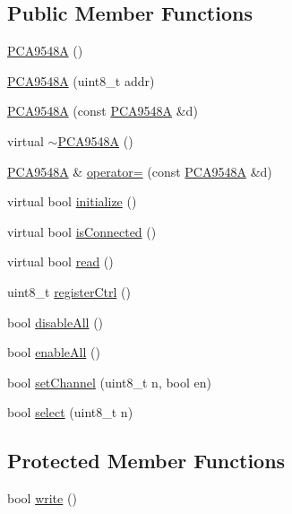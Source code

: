 \subsection*{Public Member Functions}
\begin{DoxyCompactItemize}
\item 
\hyperlink{classsmrtobj_1_1i2c_1_1_p_c_a9548_a_a5da9ee25001c545a42d15f09ed540369}{P\+C\+A9548\+A} ()
\item 
\hyperlink{classsmrtobj_1_1i2c_1_1_p_c_a9548_a_af71a3d8fb553e56b261e9ae4f170c6cc}{P\+C\+A9548\+A} (uint8\+\_\+t addr)
\item 
\hyperlink{classsmrtobj_1_1i2c_1_1_p_c_a9548_a_a9cb4de3e7ce618a7a9eab948f964f65b}{P\+C\+A9548\+A} (const \hyperlink{classsmrtobj_1_1i2c_1_1_p_c_a9548_a}{P\+C\+A9548\+A} \&d)
\item 
virtual \hyperlink{classsmrtobj_1_1i2c_1_1_p_c_a9548_a_a1ca58fa8d04182e8a4331c2df22f8ff0}{$\sim$\+P\+C\+A9548\+A} ()
\item 
\hyperlink{classsmrtobj_1_1i2c_1_1_p_c_a9548_a}{P\+C\+A9548\+A} \& \hyperlink{classsmrtobj_1_1i2c_1_1_p_c_a9548_a_a3e4b0f941a2b34832a982c88c37daf98}{operator=} (const \hyperlink{classsmrtobj_1_1i2c_1_1_p_c_a9548_a}{P\+C\+A9548\+A} \&d)
\item 
virtual bool \hyperlink{classsmrtobj_1_1i2c_1_1_p_c_a9548_a_aad4b31d15abdf2514592b045530d82f3}{initialize} ()
\item 
virtual bool \hyperlink{classsmrtobj_1_1i2c_1_1_p_c_a9548_a_a2a697b995f40560498d2721a1e99e94a}{is\+Connected} ()
\item 
virtual bool \hyperlink{classsmrtobj_1_1i2c_1_1_p_c_a9548_a_af1dceb4c9b1cd4d4a1b15888ec793d38}{read} ()
\item 
uint8\+\_\+t \hyperlink{classsmrtobj_1_1i2c_1_1_p_c_a9548_a_a4f85bf0f2b6fd20f7c45a47daeabf337}{register\+Ctrl} ()
\item 
bool \hyperlink{classsmrtobj_1_1i2c_1_1_p_c_a9548_a_ac0f6f33e90b99a8cc83d1494ca0e69d9}{disable\+All} ()
\item 
bool \hyperlink{classsmrtobj_1_1i2c_1_1_p_c_a9548_a_af5f958d8cf301e98bf57eb6a6be4ee1a}{enable\+All} ()
\item 
bool \hyperlink{classsmrtobj_1_1i2c_1_1_p_c_a9548_a_a968beb6c12bfba1bbdb6b83ae69c11a0}{set\+Channel} (uint8\+\_\+t n, bool en)
\item 
bool \hyperlink{classsmrtobj_1_1i2c_1_1_p_c_a9548_a_ae500efb81c3a568d62b96777851f2b0e}{select} (uint8\+\_\+t n)
\end{DoxyCompactItemize}
\subsection*{Protected Member Functions}
\begin{DoxyCompactItemize}
\item 
bool \hyperlink{classsmrtobj_1_1i2c_1_1_p_c_a9548_a_ac2040afd2513758d699a9746bcbbccc1}{write} ()
\end{DoxyCompactItemize}
